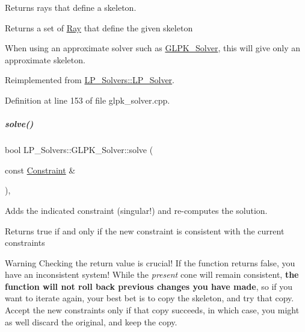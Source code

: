 Returns rays that define a skeleton. 

\begin{DoxyReturn}{Returns}
a set of \hyperlink{group___c_l_s_solvers_class_l_p___solvers_1_1_ray}{Ray} that define the given skeleton
\end{DoxyReturn}
When using an approximate solver such as \hyperlink{group___c_l_s_solvers_class_l_p___solvers_1_1_g_l_p_k___solver}{G\+L\+P\+K\+\_\+\+Solver}, this will give only an approximate skeleton. 

Reimplemented from \hyperlink{group___c_l_s_solvers_a8328f67af66c81db467a6366f48ba3c8}{L\+P\+\_\+\+Solvers\+::\+L\+P\+\_\+\+Solver}.



Definition at line 153 of file glpk\+\_\+solver.\+cpp.

\mbox{\label{group___c_l_s_solvers_aadfa4655b194b3b095db962c5900fee6}} 
\subparagraph{\texorpdfstring{solve()}{solve()}\hspace{0.1cm}{\footnotesize\ttfamily [1/2]}}
{\footnotesize\ttfamily bool L\+P\+\_\+\+Solvers\+::\+G\+L\+P\+K\+\_\+\+Solver\+::solve (\begin{DoxyParamCaption}\item[{const \hyperlink{group___c_l_s_solvers_class_l_p___solvers_1_1_constraint}{Constraint} \&}]{ }\end{DoxyParamCaption})\hspace{0.3cm}{\ttfamily [override]}, {\ttfamily [virtual]}}



Adds the indicated constraint (singular!) and re-\/computes the solution. 

\begin{DoxyReturn}{Returns}
{\ttfamily true} if and only if the new constraint is consistent with the current constraints
\end{DoxyReturn}
\begin{DoxyWarning}{Warning}
Checking the return value is crucial! If the function returns {\ttfamily false}, you have an inconsistent system! While the {\itshape present} cone will remain consistent, {\bfseries the function will not roll back previous changes you have made}, so if you want to iterate again, your best bet is to copy the skeleton, and try that copy. Accept the new constraints only if that copy succeeds, in which case, you might as well discard the original, and keep the copy. 
\end{DoxyWarning}


